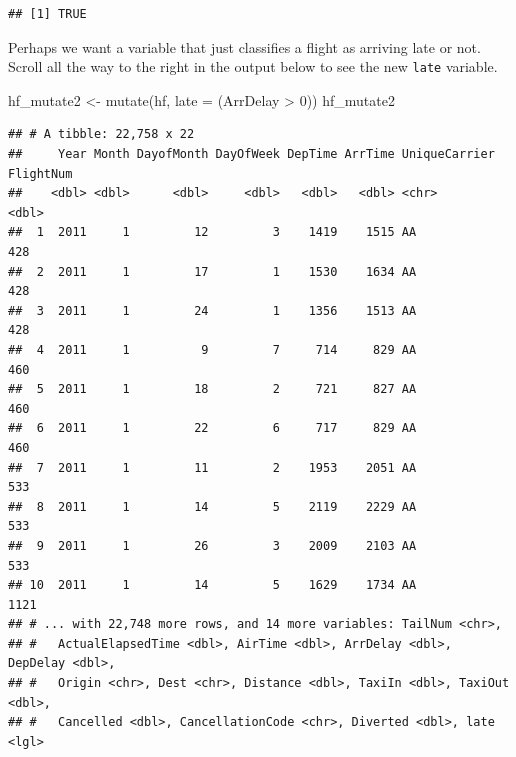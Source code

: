 \documentclass[
]{book}
\newenvironment{Shaded}{\begin{snugshade}}{\end{snugshade}}
\newcommand{\AttributeTok}[1]{\textcolor[rgb]{0.77,0.63,0.00}{#1}}
\newcommand{\DecValTok}[1]{\textcolor[rgb]{0.00,0.00,0.81}{#1}}
\newcommand{\FunctionTok}[1]{\textcolor[rgb]{0.00,0.00,0.00}{#1}}
\newcommand{\NormalTok}[1]{#1}
\newcommand{\OtherTok}[1]{\textcolor[rgb]{0.56,0.35,0.01}{#1}}
\newcommand{\SpecialCharTok}[1]{\textcolor[rgb]{0.00,0.00,0.00}{#1}}
\begin{document}
\begin{Shaded}
\end{Shaded}

\begin{verbatim}
## [1] TRUE
\end{verbatim}

Perhaps we want a variable that just classifies a flight as arriving late or not. Scroll all the way to the right in the output below to see the new \texttt{late} variable.

\begin{Shaded}
\begin{Highlighting}[]
\NormalTok{hf\_mutate2 }\OtherTok{\textless{}{-}} \FunctionTok{mutate}\NormalTok{(hf, }\AttributeTok{late =}\NormalTok{ (ArrDelay }\SpecialCharTok{\textgreater{}} \DecValTok{0}\NormalTok{))}
\NormalTok{hf\_mutate2}
\end{Highlighting}
\end{Shaded}

\begin{verbatim}
## # A tibble: 22,758 x 22
##     Year Month DayofMonth DayOfWeek DepTime ArrTime UniqueCarrier FlightNum
##    <dbl> <dbl>      <dbl>     <dbl>   <dbl>   <dbl> <chr>             <dbl>
##  1  2011     1         12         3    1419    1515 AA                  428
##  2  2011     1         17         1    1530    1634 AA                  428
##  3  2011     1         24         1    1356    1513 AA                  428
##  4  2011     1          9         7     714     829 AA                  460
##  5  2011     1         18         2     721     827 AA                  460
##  6  2011     1         22         6     717     829 AA                  460
##  7  2011     1         11         2    1953    2051 AA                  533
##  8  2011     1         14         5    2119    2229 AA                  533
##  9  2011     1         26         3    2009    2103 AA                  533
## 10  2011     1         14         5    1629    1734 AA                 1121
## # ... with 22,748 more rows, and 14 more variables: TailNum <chr>,
## #   ActualElapsedTime <dbl>, AirTime <dbl>, ArrDelay <dbl>, DepDelay <dbl>,
## #   Origin <chr>, Dest <chr>, Distance <dbl>, TaxiIn <dbl>, TaxiOut <dbl>,
## #   Cancelled <dbl>, CancellationCode <chr>, Diverted <dbl>, late <lgl>
\end{verbatim}
\end{document}
